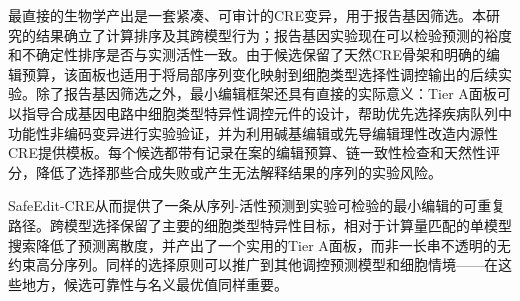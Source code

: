 最直接的生物学产出是一套紧凑、可审计的CRE变异，用于报告基因筛选。本研究的结果确立了计算排序及其跨模型行为；报告基因实验现在可以检验预测的裕度和不确定性排序是否与实测活性一致。由于候选保留了天然CRE骨架和明确的编辑预算，该面板也适用于将局部序列变化映射到细胞类型选择性调控输出的后续实验。除了报告基因筛选之外，最小编辑框架还具有直接的实际意义：Tier A面板可以指导合成基因电路中细胞类型特异性调控元件的设计，帮助优先选择疾病队列中功能性非编码变异进行实验验证，并为利用碱基编辑或先导编辑理性改造内源性CRE提供模板。每个候选都带有记录在案的编辑预算、链一致性检查和天然性评分，降低了选择那些合成失败或产生无法解释结果的序列的实验风险。

SafeEdit-CRE从而提供了一条从序列-活性预测到实验可检验的最小编辑的可重复路径。跨模型选择保留了主要的细胞类型特异性目标，相对于计算量匹配的单模型搜索降低了预测离散度，并产出了一个实用的Tier A面板，而非一长串不透明的无约束高分序列。同样的选择原则可以推广到其他调控预测模型和细胞情境——在这些地方，候选可靠性与名义最优值同样重要。
